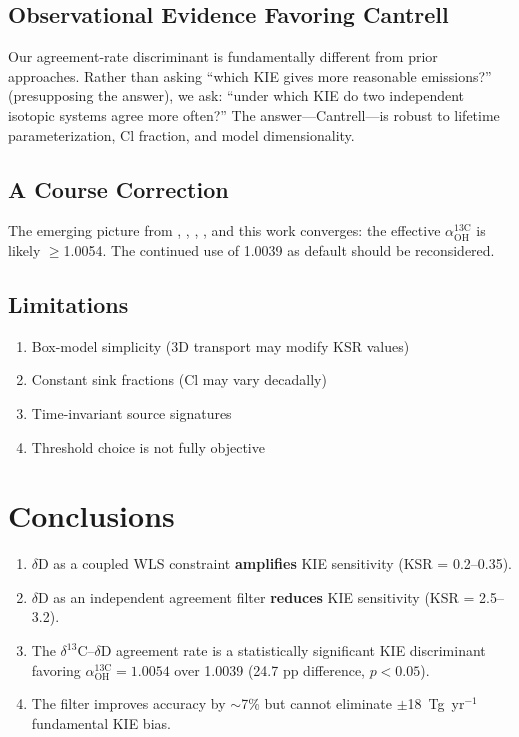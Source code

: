 \documentclass[11pt,twocolumn]{article}
\begin{document}
\subsection{Observational Evidence Favoring Cantrell}

Our agreement-rate discriminant is fundamentally different from prior approaches. Rather than asking ``which KIE gives more reasonable emissions?'' (presupposing the answer), we ask: ``under which KIE do two independent isotopic systems agree more often?'' The answer---Cantrell---is robust to lifetime parameterization, Cl fraction, and model dimensionality.

\subsection{A Course Correction}

The emerging picture from \citet{He2026JGR}, \citet{Dasgupta2025}, \citet{Chandra2024}, \citet{Whitehill2023}, and this work converges: the effective $\alpha_{\mathrm{OH}}^{13\mathrm{C}}$ is likely $\geq$1.0054. The continued use of 1.0039 as default should be reconsidered.

\subsection{Limitations}

\begin{enumerate}
\item Box-model simplicity (3D transport may modify KSR values)
\item Constant sink fractions (Cl may vary decadally)
\item Time-invariant source signatures
\item Threshold choice is not fully objective
\end{enumerate}

\section{Conclusions}

\begin{enumerate}
\item $\delta$D as a coupled WLS constraint \textbf{amplifies} KIE sensitivity (KSR = 0.2--0.35).
\item $\delta$D as an independent agreement filter \textbf{reduces} KIE sensitivity (KSR = 2.5--3.2).
\item The $\delta^{13}$C--$\delta$D agreement rate is a statistically significant KIE discriminant favoring $\alpha_{\mathrm{OH}}^{13\mathrm{C}} = 1.0054$ over 1.0039 (24.7 pp difference, $p < 0.05$).
\item The filter improves accuracy by $\sim$7\% but cannot eliminate $\pm$18~Tg~yr$^{-1}$ fundamental KIE bias.
\end{enumerate}
\end{document}
